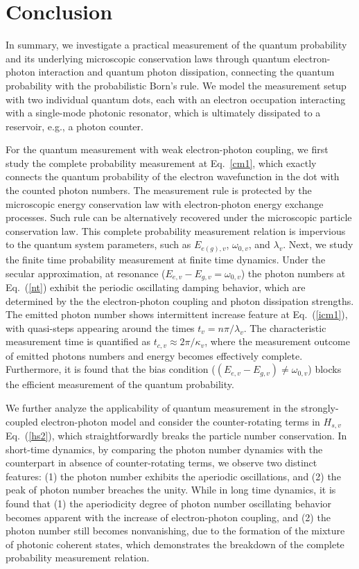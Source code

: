 \documentclass[twocolumn,showpacs,preprintnumbers,amsmath,amssymb]{revtex4}
\begin{document}
	
\section{Conclusion}
In summary, we investigate a practical measurement of the quantum probability and its underlying microscopic conservation laws through quantum electron-photon interaction and quantum photon dissipation, connecting the quantum probability with the probabilistic Born's rule. We model the measurement setup with two individual quantum dots, each with an electron occupation interacting with a single-mode photonic resonator, which is ultimately dissipated to a reservoir, e.g., a photon counter.

For the quantum measurement with weak electron-photon coupling, we first study the complete probability measurement at Eq.~\eqref{cm1}, which exactly connects the quantum probability of the electron wavefunction in the dot with the counted photon numbers. The measurement rule is protected by the microscopic energy conservation law with electron-photon energy exchange processes. Such rule can be alternatively recovered under the microscopic particle conservation law. This complete probability measurement relation is impervious to the quantum system parameters, such as $E_{e(g),v}$, $\omega_{0,v}$, and $\lambda_v$.
Next, we study the finite time probability measurement at finite time dynamics. Under the secular approximation, at resonance ($E_{e,v}-E_{g,v}=\omega_{0,v}$) the photon numbers at Eq.~(\ref{nt}) exhibit the periodic oscillating damping behavior, which are determined by the the electron-photon coupling and photon dissipation strengths. The emitted photon number shows intermittent increase feature at Eq.~(\ref{icm1}), with quasi-steps appearing around the times $t_v=n\pi/\lambda_v$. The characteristic measurement time is quantified as $t_{c,v}{\approx}2\pi/\kappa_v$, where the measurement outcome of emitted photons numbers and energy becomes effectively complete. Furthermore, it is found that the bias condition ($(E_{e,v}-E_{g,v}){\neq}\omega_{0,v}$) blocks the efficient measurement of the quantum probability.
	
	
	We further analyze the applicability of quantum measurement in the strongly-coupled electron-photon model and consider the counter-rotating terms in $H_{s,v}$ Eq.~(\ref{hs2}), which straightforwardly breaks the particle number conservation. In short-time dynamics, by comparing the photon number dynamics with the counterpart in absence of counter-rotating terms, we observe two distinct features:
	(1) the photon number exhibits the aperiodic oscillations, and
	(2) the peak of photon number breaches the unity.
	While in long time dynamics, it is found that
	(1) the aperiodicity degree of photon number oscillating behavior becomes apparent with the increase of electron-photon coupling, and
	(2) the photon number still becomes nonvanishing, due to the formation of the mixture of photonic coherent states, which  demonstrates the breakdown of the complete probability measurement relation.
	
\end{document}
